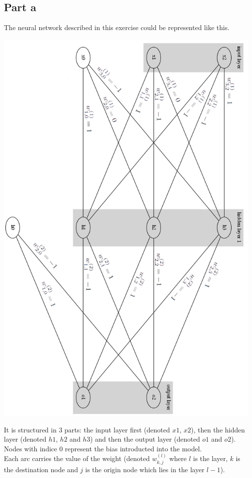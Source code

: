 \documentclass[a4paper, 10pt]{article}
\begin{document}
\subsection{Part a}
The neural network described in this exercise could be represented like this.
\begin{center}
\includegraphics[scale=0.5]{ex2_graph_export}
\end{center}
It is structured in 3 parts: the input layer first (denoted $x1$, $x2$), then the hidden layer
(denoted $h1$, $h2$ and $h3$) and then the output layer (denoted $o1$ and $o2$).
\\
Nodes with indice 0 represent the bias introducted into the model.
\\ 
Each arc carries the value of the weight (denoted $w_{k,j}^{(l)}$ where $l$ is the layer, $k$ is the destination node
and $j$ is the origin node which lies in the layer $l-1$).
\end{document}

